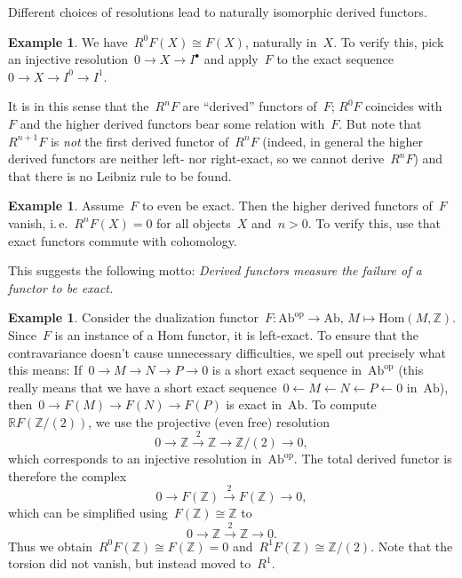 \documentclass{amsart}
\makeatletter
\theoremstyle{definition}
\newtheorem{ex}[defn]{Example}
\theoremstyle{plain}
\theoremstyle{remark}
\newcommand{\ZZ}{\mathbb{Z}}
\newcommand{\RR}{\mathbb{R}}
\newcommand{\Hom}{\mathrm{Hom}}
\newcommand{\Ab}{\mathrm{Ab}}
\newcommand{\op}{\mathrm{op}}
\newcommand{\?}{\,{:}\,}
\renewcommand{\_}{\mathpunct{.}\,}
\newcommand{\lra}{\longrightarrow}
\newcommand{\ie}{i.\,e.\@\xspace}
\makeatother
\begin{document}
Different choices of resolutions lead to naturally isomorphic derived
functors.

\begin{ex}We have~$R^0 F(X) \cong F(X)$, naturally in~$X$. To verify this, pick
an injective resolution~$0 \to X \to I^\bullet$ and apply~$F$ to
the exact sequence~$0 \to X \to I^0 \to I^1$.
\end{ex}

It is in this sense that the~$R^n F$ are ``derived'' functors of~$F$; $R^0 F$
coincides with~$F$ and the higher derived functors bear some relation with~$F$.
But note that~$R^{n+1} F$ is \emph{not} the first derived functor of~$R^n F$
(indeed, in general the higher derived functors are neither left- nor
right-exact, so we cannot derive~$R^n F$) and that there is no Leibniz rule to
be found.

\begin{ex}Assume~$F$ to even be exact. Then the higher derived functors of~$F$
vanish, \ie~$R^n F(X) = 0$ for all objects~$X$ and~$n > 0$. To verify this, use
that exact functors commute with cohomology.\end{ex}

This suggests the following motto: \emph{Derived functors measure the
failure of a functor to be exact.}

\begin{ex}Consider the dualization functor~$F : \Ab^\op \to \Ab,\,M \mapsto
\Hom(M,\ZZ)$. Since~$F$ is an instance of a Hom functor, it is left-exact. To
ensure that the contravariance doesn't cause unnecessary difficulties, we spell
out precisely what this means: If~$0 \to M \to N \to P \to 0$ is a short exact
sequence in~$\Ab^\op$ (this really means that we have a short exact sequence~$0
\leftarrow M \leftarrow N \leftarrow P \leftarrow 0$ in~$\Ab$), then~$0 \to F(M) \to F(N) \to
F(P)$ is exact in~$\Ab$. To compute~$\RR F(\ZZ/(2))$, we use the projective
(even free) resolution
\[ 0 \lra \ZZ \stackrel{2}{\longrightarrow} \ZZ \lra \ZZ/(2) \lra 0, \]
which corresponds to an injective resolution in~$\Ab^\op$. The total derived
functor is therefore the complex
\[ 0 \lra F(\ZZ) \stackrel{2}{\longrightarrow} F(\ZZ) \lra 0, \]
which can be simplified using~$F(\ZZ) \cong \ZZ$ to
\[ 0 \lra \ZZ \stackrel{2}{\longrightarrow} \ZZ \lra 0. \]
Thus we obtain~$R^0 F(\ZZ) \cong F(\ZZ) = 0$ and~$R^1 F(\ZZ) \cong \ZZ/(2)$.
Note that the torsion did not vanish, but instead moved to~$R^1$.
\end{ex}
\end{document}
